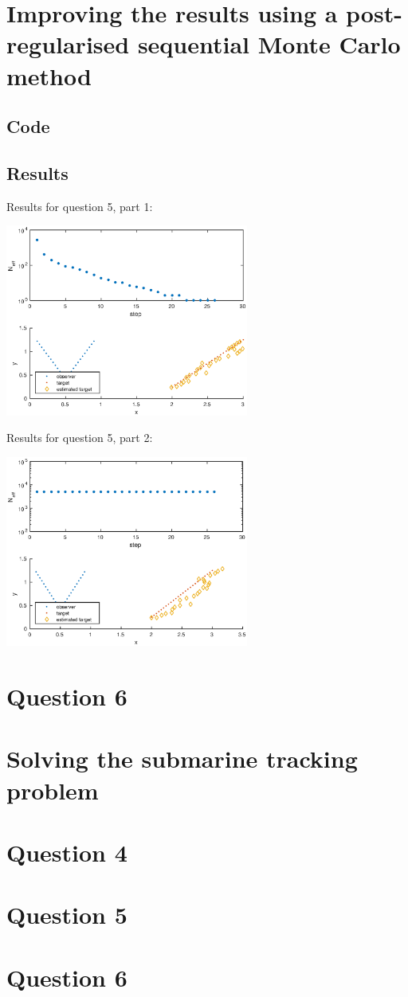 \documentclass[english,DIV=13]{scrreprt}
\begin{document}
\chapter{Improving the results using a post-regularised sequential
Monte Carlo method}
\section*{Code}

\section*{Results}
Results for question 5, part 1:
\begin{center}
   \includegraphics[width=0.6\textwidth]{img/q51.eps}
\end{center}

Results for question 5, part 2:
\begin{center}
   \includegraphics[width=0.6\textwidth]{img/q52.eps}
\end{center}

\chapter{Question 6}



\newpage
\chapter*{Solving the submarine tracking problem}

\chapter*{Question 4}

\chapter*{Question 5}


\chapter*{Question 6}
\end{document}
